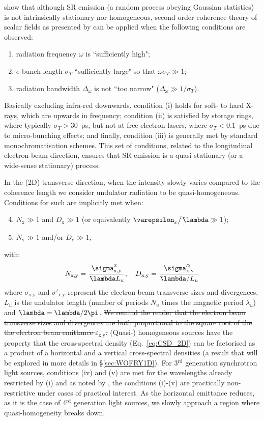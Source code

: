 \documentclass{iucr}              %
\newcommand{\remove}[1]{ {\color{blue} \sout{#1}}}
\newcommand{\lambdabar}{{\mkern0.75mu\mathchar '26\mkern -8.2mu\lambda}}
\begin{document}
 show that although SR emission (a random process obeying Gaussian statistics) is not intrinsically stationary nor homogeneous, second order coherence theory of scalar fields as presented by  can be applied when the following conditions are observed:
\begin{enumerate}[label=(\roman*)]
\item radiation frequency $\omega$ is ``sufficiently high";
\item $e$-bunch length $\sigma_{T}$ ``sufficiently large" so that $\omega\sigma_{T}\gg1$;
\item radiation bandwidth $\Delta_\omega$ is not ``too narrow" ($\Delta_\omega\gg1\big/\sigma_{T}$).
\end{enumerate}
Basically excluding infra-red downwards, condition (i) holds for soft- to hard X-rays, which are upwards in frequency; condition (ii) is satisfied by storage rings, where typically $\sigma_{T}>30$~ps, but not at free-electron lasers, where $\sigma_{T}<0.1$~ps due to micro-bunching effects; and finally, condition (iii) is generally met by standard monochromatisation schemes. This set of conditions, related to the longitudinal electron-beam direction, ensures that SR emission is a quasi-stationary (or a wide-sense stationary) process. 

In the (2D) transverse direction, when the intensity slowly varies compared to the coherence length we consider undulator radiation to be quasi-homogeneous. Conditions for such are implicitly met when: 
\begin{enumerate}[label=(\roman*)]
\setcounter{enumi}{3}
\item $N_\text{x}\gg1$ and $D_\text{x}\gg1$ (or equivalently $\varepsilon_x\big/\lambdabar\gg1$);
\item $N_\text{y}\gg1$ and/or $D_\text{y}\gg1$,
\end{enumerate}
with:
\begin{equation}
    N_\text{x,y}=\frac{\sigma^2_\text{x,y}}{\lambdabar L_u}, \quad D_\text{x,y}=\frac{\sigma'^2_\text{x,y}}{\lambdabar/L_u}
\end{equation}
where $\sigma_\text{x,y}$ and $\sigma'_\text{x,y}$ represent the electron beam transverse sizes and divergences, $L_u$ is the undulator length (number of periods $N_u$ times the magnetic period $\lambda_u$) and $\lambdabar=\lambda/2\pi$. \remove{We remind the reader that the electron beam transverse sizes and divergences are both proportional to the square root of the the electron beam emittance $\varepsilon_\text{x,y}$.} (Quasi-) homogeneous sources have the property that the cross-spectral density (Eq.~\ref{eq:CSD_2D}) can be factorised as a product of a horizontal and a vertical cross-spectral densities (a result that will be explored in more details in \S\ref{sec:WOFRY1D}). For 3$^{\text{rd}}$ generation synchrotron light sources, conditions (iv) and (v) are met for the wavelengths already restricted by (i) and as noted by , the conditions (i)-(v) are practically non-restrictive under cases of practical interest. As the horizontal emittance reduces, as it is the case of 4$^{\text{rd}}$ generation light sources, we slowly approach a region where quasi-homogeneity breaks down.
\end{document}
